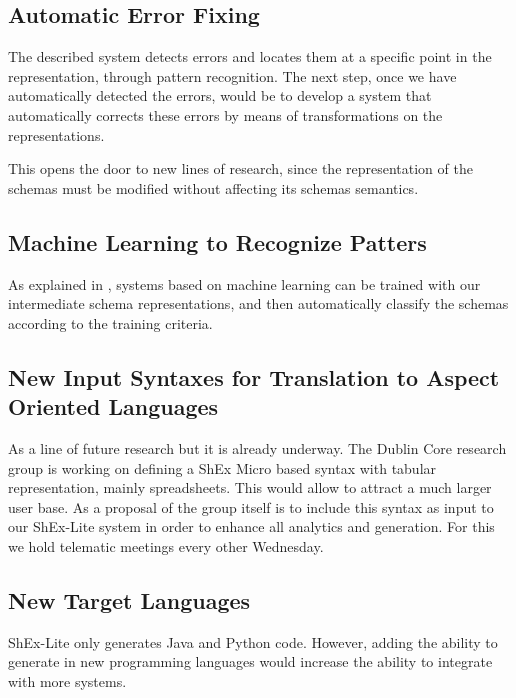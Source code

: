 \subsection{Automatic Error Fixing}
The described system detects errors and locates them at a specific point in the
representation, through pattern recognition. The next step, once we have automatically
detected the errors, would be to develop a system that automatically corrects these
errors by means of transformations on the representations.

This opens the door to new lines of research, since the representation of the
schemas must be modified without affecting its schemas semantics.

\subsection{Machine Learning to Recognize Patters}
As explained in \cite{bigcode}, systems based on machine learning can be trained with
our intermediate schema representations, and then automatically classify the schemas
according to the training criteria.

\subsection{New Input Syntaxes for Translation to Aspect Oriented Languages}
As a line of future research but it is already underway. The Dublin Core research group
is working on defining a ShEx Micro based syntax with tabular representation, mainly
spreadsheets. This would allow to attract a much larger user base. As a proposal of
the group itself is to include this syntax as input to our ShEx-Lite system in order
to enhance all analytics and generation. For this we hold telematic meetings every
other Wednesday.

\subsection{New Target Languages}
ShEx-Lite only generates Java and Python code. However, adding the ability to generate
in new programming languages would increase the ability to integrate with more systems.